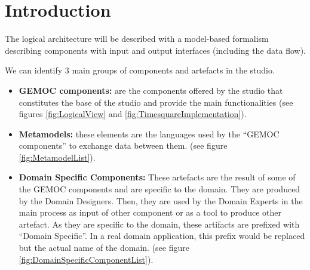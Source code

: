 \documentclass{gemoc} %
\begin{document}
\section{Introduction}
The logical architecture will be described with a model-based formalism describing components with input and output interfaces (including the data flow).

We can identify 3 main groups of components and artefacts in the studio.

\begin{itemize}
	\item \textbf{GEMOC components:} are the components offered by the studio that constitutes the base of the studio and provide the main functionalities (see figures \ref{fig:LogicalView} and \ref{fig:TimesquareImplementation}).
	\item \textbf{Metamodels:} these elements are the languages used by the ``GEMOC components'' to exchange data between them. (see figure \ref{fig:MetamodelList}).
	\item \textbf{Domain Specific Components:} These artefacts are the result of some of the GEMOC components and are specific to the domain. They are produced by the Domain Designers. Then, they are used by the Domain Experts in the main process as input of other component or as a tool to produce other artefact. As they are specific to the domain, these artifacts are prefixed with ``Domain Specific''. In a real domain application, this prefix would be replaced but the actual name of the domain. (see figure \ref{fig:DomainSpecificComponentList}).
\end{itemize}
\end{document}
